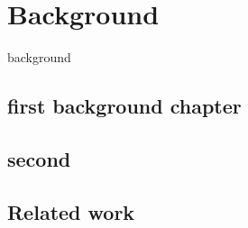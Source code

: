 \chapter{Background}
\label{chap:foundation}

background

\section{first background chapter}
\label{sec:networks}

\section{second}
\label{sec:ie}

\section{Related work}
\label{sec:related}
